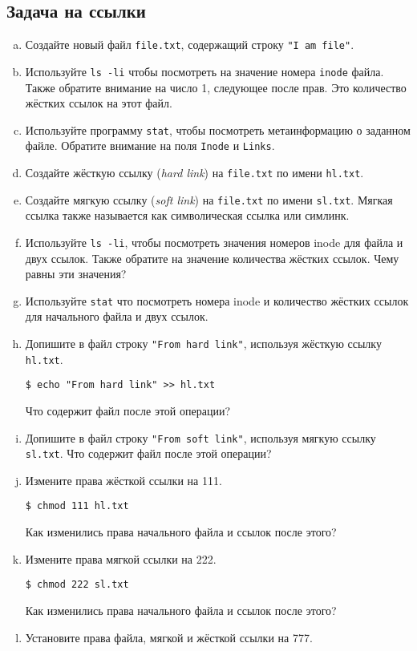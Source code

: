 \documentclass{article}
\begin{document}
\subsection{Задача на ссылки}
\begin{enumerate}[(a)]
\item Создайте новый файл \texttt{file.txt}, содержащий строку \texttt{"I am file"}.
\item Используйте \texttt{ls -li} чтобы посмотреть на значение номера \texttt{inode} файла. Также обратите внимание на число 1, следующее после прав. Это количество жёстких ссылок на этот файл.
\item Используйте программу \texttt{stat}, чтобы посмотреть метаинформацию о заданном файле. Обратите внимание на поля \texttt{Inode} и \texttt{Links}.
\item Создайте жёсткую ссылку (\textit{hard link}) на \texttt{file.txt} по имени \texttt{hl.txt}.
\item Создайте мягкую ссылку (\textit{soft link}) на \texttt{file.txt} по имени \texttt{sl.txt}. Мягкая ссылка также называется как символическая ссылка или симлинк.
\item Используйте \texttt{ls -li}, чтобы посмотреть значения номеров inode для файла и двух ссылок. Также обратите на значение количества жёстких ссылок. Чему равны эти значения?
\item Используйте \texttt{stat} что посмотреть номера inode и количество жёстких ссылок для начального файла и двух ссылок. 
\item Допишите в файл строку \texttt{"From hard link"}, используя жёсткую ссылку \texttt{hl.txt}.
\begin{lstlisting}
$ echo "From hard link" >> hl.txt
\end{lstlisting}
Что содержит файл после этой операции?
\item Допишите в файл строку \texttt{"From soft link"}, используя мягкую ссылку \texttt{sl.txt}. Что содержит файл после этой операции?
\item Измените права жёсткой ссылки на 111. 
\begin{lstlisting}
$ chmod 111 hl.txt
\end{lstlisting}
Как изменились права начального файла и ссылок после этого?
\item Измените права мягкой ссылки на 222. 
\begin{lstlisting}
$ chmod 222 sl.txt
\end{lstlisting}
Как изменились права начального файла и ссылок после этого?
\item Установите права файла, мягкой и жёсткой ссылки на 777.

\end{enumerate}
\end{document}
